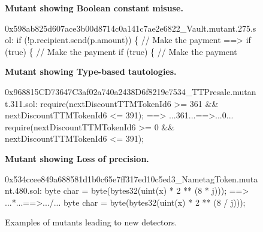 \begin{figure}
  {\scriptsize
      {\bf Mutant showing Boolean constant misuse.}

    
\noindent \begin{code}
 0x598ab825d607ace3b00d8714c0a141c7ae2e6822\_Vault.mutant.275.sol:
 if (!p.recipient.send(p.amount)) \{  // Make the payment
 ==>          if (true) \{  // Make the payment
 if (true) \{  // Make the payment
      \end{code}

      }

      {\scriptsize
              {\bf Mutant showing Type-based tautologies.}
\begin{code}
 0x968815CD73647C3af02a740a2438D6f8219e7534\_TTPresale.mutant.311.sol:
 require(nextDiscountTTMTokenId6 >= 361 \&\& nextDiscountTTMTokenId6 <= 391);
 ==>  ...361...==>...0...
 require(nextDiscountTTMTokenId6 >= 0 \&\& nextDiscountTTMTokenId6 <= 391);
      \end{code}
      }


      {\scriptsize
      {\bf Mutant showing Loss of precision.}        
\begin{code}
 0x534ccee849a688581d1b0c65e7ff317ed10c5ed3\_NametagToken.mutant.480.sol:
 byte char = byte(bytes32(uint(x) * 2 ** (8 * j)));
 ==>  ...*...==>.../...
 byte char = byte(bytes32(uint(x) * 2 ** (8 / j)));
      \end{code}

}
        \caption{Examples of mutants leading to new detectors.}
       \label{fig:newdetect}
    \end{figure}

